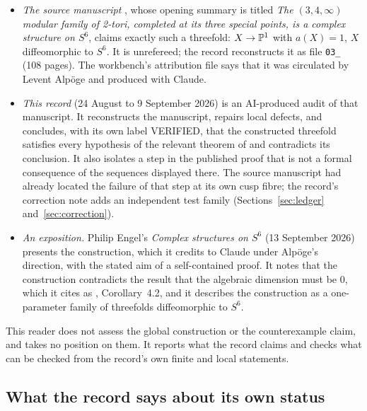 \begin{itemize}
\item \emph{The source manuscript} \cite{AlpogeS6}, whose opening summary is titled \emph{The $(3,4,\infty)$ modular family of 2-tori, completed at its three special points, is a complex structure on $S^6$}, claims exactly such a threefold: $X\to\mathbb{P}^1$ with $a(X)=1$, $X$ diffeomorphic to $S^6$. It is unrefereed; the record reconstructs it as file \texttt{03\_} (108 pages). The workbench's attribution file says that it was circulated by Levent Alpöge and produced with Claude.
\item \emph{This record} (24 August to 9 September 2026) is an AI-produced audit of that manuscript. It reconstructs the manuscript, repairs local defects, and concludes, with its own label \textsf{VERIFIED}, that the constructed threefold satisfies every hypothesis of the relevant theorem of \cite{CDP20} and contradicts its conclusion. It also isolates a step in the published proof that is not a formal consequence of the sequences displayed there. The source manuscript had already located the failure of that step at its own cusp fibre; the record's correction note adds an independent test family (Sections~\ref{sec:ledger} and~\ref{sec:correction}).
\item \emph{An exposition.} Philip Engel's \emph{Complex structures on $S^6$} (13 September 2026) \cite{EngelS6} presents the construction, which it credits to Claude under Alpöge's direction, with the stated aim of a self-contained proof. It notes that the construction contradicts the result that the algebraic dimension must be $0$, which it cites as \cite{CDP98}, Corollary~4.2, and it describes the construction as a one-parameter family of threefolds diffeomorphic to $S^6$.
\end{itemize}
This reader does not assess the global construction or the counterexample claim, and takes no position on them. It reports what the record claims and checks what can be checked from the record's own finite and local statements.

\subsection{What the record says about its own status}

